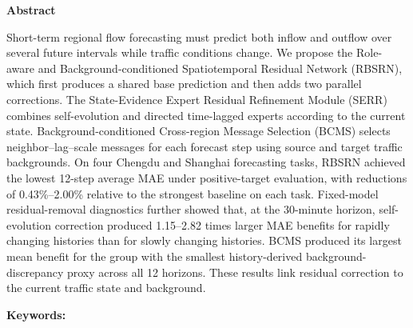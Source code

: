 \begingroup
\maketitle
\frontmatterrevisionstyle
\begin{center}
  \normalsize\bfseries Abstract
\end{center}
{\small\setlength{\parindent}{0pt}
Short-term regional flow forecasting must predict both inflow and outflow over several future intervals while traffic conditions change. We propose the Role-aware and Background-conditioned Spatiotemporal Residual Network (RBSRN), which first produces a shared base prediction and then adds two parallel corrections. The State-Evidence Expert Residual Refinement Module (SERR) combines self-evolution and directed time-lagged experts according to the current state. Background-conditioned Cross-region Message Selection (BCMS) selects neighbor--lag--scale messages for each forecast step using source and target traffic backgrounds. On four Chengdu and Shanghai forecasting tasks, RBSRN achieved the lowest 12-step average MAE under positive-target evaluation, with reductions of 0.43\%--2.00\% relative to the strongest baseline on each task. Fixed-model residual-removal diagnostics further showed that, at the 30-minute horizon, self-evolution correction produced 1.15--2.82 times larger MAE benefits for rapidly changing histories than for slowly changing histories. BCMS produced its largest mean benefit for the group with the smallest history-derived background-discrepancy proxy across all 12 horizons. These results link residual correction to the current traffic state and background.
\par\vspace{0.8em}
\noindent\textbf{Keywords: }\paperkeywords
\par}
\endgroup
\vspace{1em}

